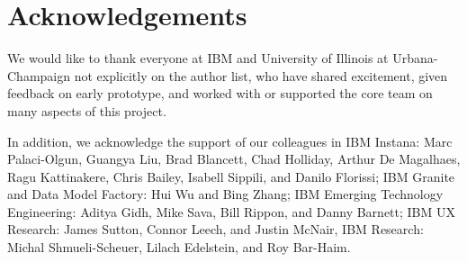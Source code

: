 \section*{Acknowledgements}
We would like to thank everyone at IBM and University of Illinois at Urbana-Champaign not explicitly on the author list, who have shared excitement, given feedback on early prototype, and worked with or supported the core team on many aspects of this project. 

In addition, we acknowledge the support of our colleagues in IBM Instana: Marc Palaci-Olgun, Guangya Liu, Brad Blancett, Chad Holliday, Arthur De Magalhaes, Ragu Kattinakere, Chris Bailey, Isabell Sippili, and Danilo Florissi; IBM Granite and Data Model Factory: Hui Wu and Bing Zhang; IBM Emerging Technology Engineering: Aditya Gidh, Mike Sava, Bill Rippon, and Danny Barnett; IBM UX Research: James Sutton, Connor Leech, and Justin McNair, IBM Research: Michal Shmueli-Scheuer, Lilach Edelstein, and Roy Bar-Haim.
